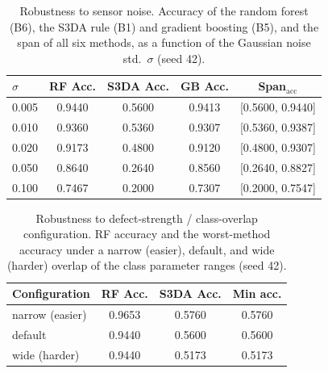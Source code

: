 \documentclass[3p]{elsarticle}
\begin{document}
\begin{table}[htbp]
\centering
\caption{Robustness to sensor noise. Accuracy of the random forest (B6), the S3DA rule (B1) and gradient boosting (B5), and the span of all six methods, as a function of the Gaussian noise std.\ $\sigma$ (seed 42).}
\label{tab:noise}
\begin{tabular}{lcccc}
\toprule
$\sigma$ & RF Acc. & S3DA Acc. & GB Acc. & Span$_{\mathrm{acc}}$ \\
\midrule
0.005 & 0.9440 & 0.5600 & 0.9413 & [0.5600, 0.9440] \\
0.010 & 0.9360 & 0.5360 & 0.9307 & [0.5360, 0.9387] \\
0.020 & 0.9173 & 0.4800 & 0.9120 & [0.4800, 0.9307] \\
0.050 & 0.8640 & 0.2640 & 0.8560 & [0.2640, 0.8827] \\
0.100 & 0.7467 & 0.2000 & 0.7307 & [0.2000, 0.7547] \\
\bottomrule
\end{tabular}
\end{table}

\begin{table}[htbp]
\centering
\caption{Robustness to defect-strength / class-overlap configuration. RF accuracy and the worst-method accuracy under a narrow (easier), default, and wide (harder) overlap of the class parameter ranges (seed 42).}
\label{tab:defect}
\begin{tabular}{lccc}
\toprule
Configuration & RF Acc. & S3DA Acc. & Min acc. \\
\midrule
narrow (easier) & 0.9653 & 0.5760 & 0.5760 \\
default & 0.9440 & 0.5600 & 0.5600 \\
wide (harder) & 0.9440 & 0.5173 & 0.5173 \\
\bottomrule
\end{tabular}
\end{table}
\end{document}
